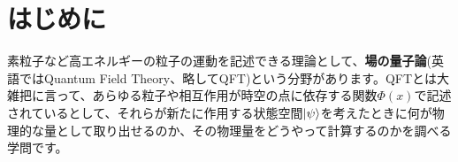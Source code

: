 \documentclass[unicode,a4paper,10pt]{ltjsarticle}
\begin{document}
\maketitle
\tableofcontents

\clearpage
\section{はじめに}

素粒子など高エネルギーの粒子の運動を記述できる理論として、\textbf{場の量子論}(英語ではQuantum Field Theory、略してQFT)という分野があります。QFTとは大雑把に言って、あらゆる粒子や相互作用が時空の点に依存する関数$\Phi(x)$で記述されているとして、それらが新たに作用する状態空間$\ket{\psi}$を考えたときに何が物理的な量として取り出せるのか、その物理量をどうやって計算するのかを調べる学問です。













\clearpage



\nocite{Nakahara:2003}
\nocite{Peskin:1995}
\nocite{Fujikawa:2001b}
\nocite{Nair:2005}

\end{document}
